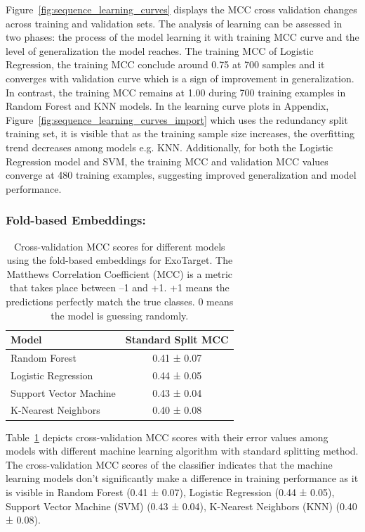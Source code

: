 Figure~\ref{fig:sequence_learning_curves} displays the  \gls{MCC} cross validation changes across training and validation sets. The analysis of learning can be assessed in two phases: the process of the model learning it with training  \gls{MCC} curve and the level of generalization the model reaches. The training  \gls{MCC} of Logistic Regression, the training  \gls{MCC} conclude around 0.75 at 700 samples and it converges with validation curve which is a sign of improvement in generalization. In contrast, the training  \gls{MCC} remains at 1.00 during 700 training examples in Random Forest and \gls{KNN} models.
In the learning curve plots in Appendix, Figure~\ref{fig:sequence_learning_curves_import} 
which uses the redundancy split training set, it is visible that as the training sample size increases, the overfitting trend decreases among models e.g. \gls{KNN}. Additionally, for both the Logistic Regression model and \gls{SVM}, the training  \gls{MCC} and validation \gls{MCC} values converge at 480 training examples, suggesting improved generalization and model performance.

\subsubsection{Fold-based Embeddings:}  

\begin{table}[H]
	\centering
	\caption{Cross-validation \gls{MCC}  scores for different models using the fold-based embeddings for ExoTarget. The Matthews Correlation Coefficient (MCC) is a metric that takes place between –1 and +1. +1 means the predictions perfectly match the true classes. 0 means the model is guessing randomly.}
	\begin{tabular}{lc}
		\toprule
		\textbf{Model} & \textbf{Standard Split MCC} \\
		\midrule
		Random Forest           & 0.41 ± 0.07 \\
		Logistic Regression     & 0.44 ± 0.05 \\
		Support Vector Machine  & 0.43 ± 0.04 \\
		K-Nearest Neighbors     & 0.40 ± 0.08 \\
		\bottomrule
	\end{tabular}
	
	\label{tab:standard_split_mcc_target}
\end{table}

Table~\ref{tab:standard_split_mcc_target} depicts cross-validation \gls{MCC}  scores with their error values among models with different machine learning algorithm with standard splitting method. The cross-validation \gls{MCC} scores of the classifier indicates that the machine learning models don't significantly make a difference in training performance as it is visible in Random Forest (0.41 ± 0.07), Logistic Regression (0.44 ± 0.05), Support Vector Machine (SVM) (0.43 ± 0.04), K-Nearest Neighbors (KNN) (0.40 ± 0.08). 

